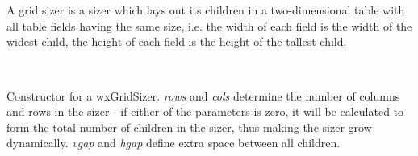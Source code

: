 \section{}\label{wxgridsizer}

A grid sizer is a sizer which lays out its children in a two-dimensional
table with all table fields having the same size,
i.e. the width of each field is the width of the widest child,
the height of each field is the height of the tallest child.


\\

\label{wxgridsizerwxgridsizer}



Constructor for a wxGridSizer. {\it rows} and {\it cols} determine the number of
columns and rows in the sizer - if either of the parameters is zero, it will be
calculated to form the total number of children in the sizer, thus making the
sizer grow dynamically. {\it vgap} and {\it hgap} define extra space between
all children.


